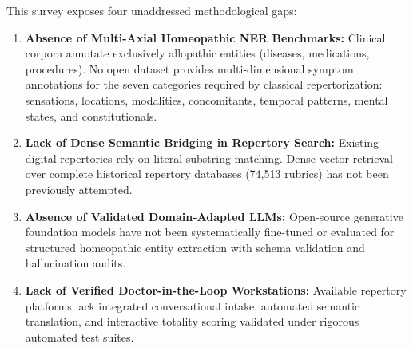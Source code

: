 This survey exposes four unaddressed methodological gaps:
\begin{enumerate}
    \item \textbf{Absence of Multi-Axial Homeopathic NER Benchmarks:} Clinical corpora annotate exclusively allopathic entities (diseases, medications, procedures). No open dataset provides multi-dimensional symptom annotations for the seven categories required by classical repertorization: sensations, locations, modalities, concomitants, temporal patterns, mental states, and constitutionals.
    \item \textbf{Lack of Dense Semantic Bridging in Repertory Search:} Existing digital repertories rely on literal substring matching. Dense vector retrieval over complete historical repertory databases (74,513 rubrics) has not been previously attempted.
    \item \textbf{Absence of Validated Domain-Adapted LLMs:} Open-source generative foundation models have not been systematically fine-tuned or evaluated for structured homeopathic entity extraction with schema validation and hallucination audits.
    \item \textbf{Lack of Verified Doctor-in-the-Loop Workstations:} Available repertory platforms lack integrated conversational intake, automated semantic translation, and interactive totality scoring validated under rigorous automated test suites.
\end{enumerate}
